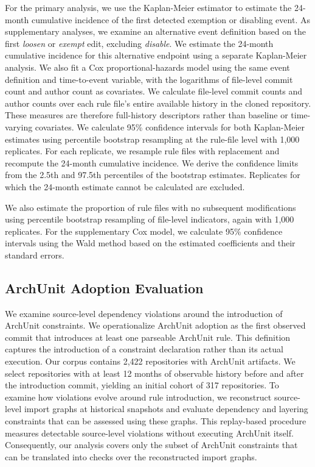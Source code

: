 For the primary analysis, we use the Kaplan-Meier estimator
\cite{kaplan1958nonparametric} to estimate the 24-month
cumulative incidence of the first detected exemption or
disabling event. As supplementary analyses, we examine an
alternative event definition based on the first
\emph{loosen} or \emph{exempt} edit, excluding \emph{disable}.
We estimate the 24-month cumulative incidence for this
alternative endpoint using a separate Kaplan-Meier analysis.
We also fit a Cox proportional-hazards model using the same
event definition and time-to-event variable, with the
logarithms of file-level commit count and author count
as covariates. We calculate file-level commit counts and author counts
over each rule file's entire available history in the
cloned repository. These measures are therefore full-history
descriptors rather than baseline or time-varying covariates.
We calculate 95\% confidence intervals for both
Kaplan-Meier estimates using percentile bootstrap
resampling at the rule-file level with 1,000 replicates.
For each replicate, we resample rule files with replacement
and recompute the 24-month cumulative incidence. We derive
the confidence limits from the 2.5th and 97.5th percentiles
of the bootstrap estimates. Replicates for which the
24-month estimate cannot be calculated are excluded.

We also estimate the proportion of rule files with no
subsequent modifications using percentile bootstrap
resampling of file-level indicators, again with 1,000
replicates. For the supplementary Cox model, we calculate
95\% confidence intervals using the Wald method based on
the estimated coefficients and their standard errors.

\subsection{ArchUnit Adoption Evaluation}

We examine source-level dependency violations around the introduction of ArchUnit constraints. We operationalize ArchUnit adoption as the first observed commit that introduces at least one parseable ArchUnit rule. This definition captures the introduction of a constraint declaration rather than its actual execution. Our corpus contains 2,422 repositories with ArchUnit artifacts. We select repositories with at least 12 months of observable history before and after the introduction commit, yielding an initial cohort of 317 repositories.
To examine how violations evolve around rule introduction, we reconstruct source-level import graphs at historical snapshots and evaluate dependency and layering constraints that can be assessed using these graphs. This replay-based procedure measures detectable source-level violations without executing ArchUnit itself. Consequently, our analysis covers only the subset of ArchUnit constraints that can be translated into checks over the reconstructed import graphs.


